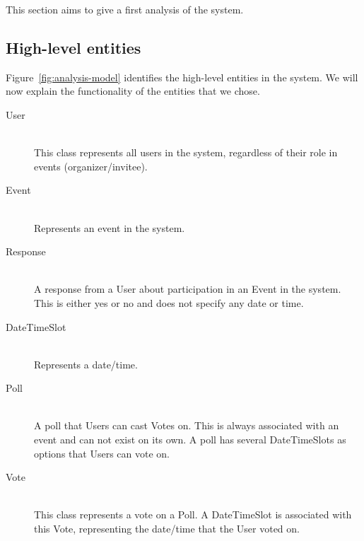 This section aims to give a first analysis of the system.

\subsection{High-level entities}
	Figure~\ref{fig:analysis-model} identifies the high-level entities in the system. We will now explain the functionality of the entities that we chose.

	\begin{description}
		\item[User] \hfill \\
			This class represents all users in the system, regardless of their role in events (organizer/invitee).
		\item[Event] \hfill \\
			Represents an event in the system.
		\item[Response] \hfill \\
			A response from a User about participation in an Event in the system. This is either yes or no and does not specify any date or time.
		\item[DateTimeSlot] \hfill \\
			Represents a date/time.
		\item[Poll] \hfill \\
			A poll that Users can cast Votes on. This is always associated with an event and can not exist on its own. A poll has several DateTimeSlots as options that Users can vote on.
		\item[Vote] \hfill \\
			This class represents a vote on a Poll. A DateTimeSlot is associated with this Vote, representing the date/time that the User voted on.
			
	\end{description}
	
